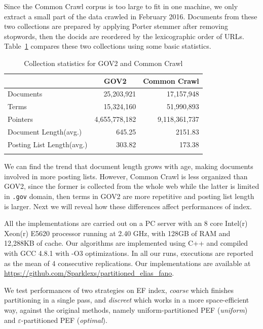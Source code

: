 \documentclass[runningheads]{comsis2}
\begin{document}
Since the Common Crawl corpus is too large to fit in one machine, we only extract a small part of the data crawled in February 2016.
Documents from these two collections are prepared by applying Porter stemmer after removing stopwords, then the docids are reordered by the lexicographic order of URLs.
Table~\ref{tab:collection statistics} compares these two collections using some basic statistics.

\begin{table}
	\centering
	\caption{Collection statistics for GOV2 and Common Crawl}
	\renewcommand{\arraystretch}{1.0}
	\begin{tabular}{l*{2}{r}}
		\toprule
		& \multicolumn{1}{c}{GOV2} & \multicolumn{1}{c}{Common Crawl} \\
		\midrule
		Documents & 25,203,921 & 17,157,948 \\
		Terms & 15,324,160 & 51,990,893 \\
		Pointers & 4,655,778,182 & 9,118,361,737 \\
		Document Length(avg.) & 645.25 & 2151.83 \\
		Posting List Length(avg.) & 303.82 & 173.38 \\
		\bottomrule
		\label{tab:collection statistics}
	\end{tabular}
\end{table}

We can find the trend that document length grows with age, making documents involved in more posting lists.
However, Common Crawl is less organized than GOV2, since the former is collected from the whole web while the latter is limited in \texttt{.gov} domain, then terms in GOV2 are more repetitive and posting list length is larger.
Next we will reveal how these differences affect performances of index.

All the implementations are carried out on a PC server with an 8 core Intel(r) Xeon(r) E5620 processor running at 2.40 GHz, with 128GB of RAM and 12,288KB of cache.
Our algorithms are implemented using C++ and compiled with GCC 4.8.1 with -O3 optimizations.
In all our runs, executions are reported as the mean of 4 consecutive replications.
Our implementations are available at \url{https://github.com/Sparklexs/partitioned_elias_fano}.

We test performances of two strategies on EF index, \textit{coarse} which finishes partitioning in a single pass, and \textit{discreet} which works in a more space-efficient way, against the original methods, namely uniform-partitioned PEF (\textit{uniform}) and $\varepsilon$-partitioned PEF (\textit{optimal}).
\end{document}
